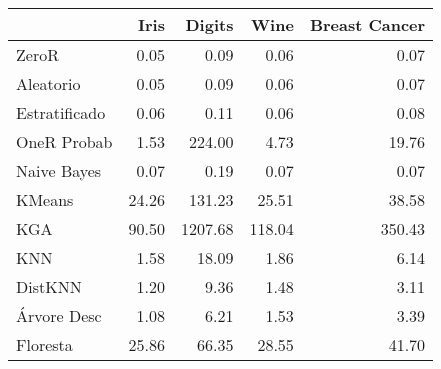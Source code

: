 \begin{table}
\centering
\label{run_time}
\begin{tabular}{lrrrr}
\toprule
{} &  Iris &  Digits &   Wine &  Breast Cancer \\
\midrule
ZeroR         &  0.05 &    0.09 &   0.06 &           0.07 \\
Aleatorio     &  0.05 &    0.09 &   0.06 &           0.07 \\
Estratificado &  0.06 &    0.11 &   0.06 &           0.08 \\
OneR Probab   &  1.53 &  224.00 &   4.73 &          19.76 \\
Naive Bayes   &  0.07 &    0.19 &   0.07 &           0.07 \\
KMeans        & 24.26 &  131.23 &  25.51 &          38.58 \\
KGA           & 90.50 & 1207.68 & 118.04 &         350.43 \\
KNN           &  1.58 &   18.09 &   1.86 &           6.14 \\
DistKNN       &  1.20 &    9.36 &   1.48 &           3.11 \\
Árvore Desc   &  1.08 &    6.21 &   1.53 &           3.39 \\
Floresta      & 25.86 &   66.35 &  28.55 &          41.70 \\
\bottomrule
\end{tabular}
\end{table}
